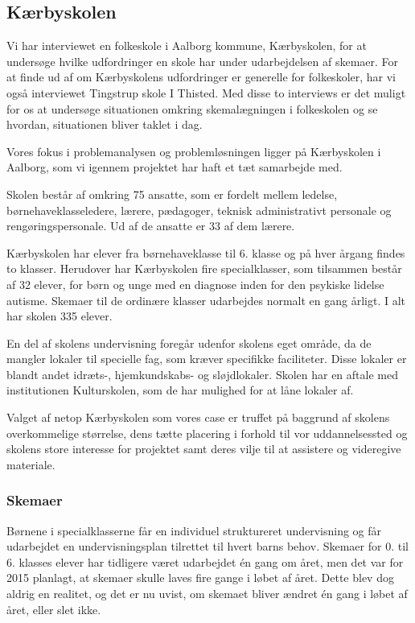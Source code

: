 \subsection{Kærbyskolen}
\label{Kaerbyskolen}
Vi har interviewet en folkeskole i Aalborg kommune, Kærbyskolen, for at undersøge hvilke udfordringer en skole har under udarbejdelsen af skemaer. For at finde ud af om Kærbyskolens udfordringer er generelle for folkeskoler, har vi også interviewet Tingstrup skole I Thisted. Med disse to interviews er det muligt for os at undersøge situationen omkring skemalægningen i folkeskolen og se hvordan, situationen bliver taklet i dag.


Vores fokus i problemanalysen og problemløsningen ligger på Kærbyskolen i Aalborg, som vi igennem projektet har haft et tæt samarbejde med.

Skolen består af omkring 75 ansatte, som er fordelt mellem ledelse, børnehaveklasseledere, lærere, pædagoger, teknisk administrativt personale og rengøringspersonale. Ud af de ansatte er 33 af dem lærere.

Kærbyskolen har elever fra børnehaveklasse til 6. klasse og på hver årgang findes to klasser. Herudover har Kærbyskolen fire specialklasser, som tilsammen består af 32 elever\cite{KaerbyskolensElevtal}, for børn og unge med en diagnose inden for den psykiske lidelse autisme. Skemaer til de ordinære klasser udarbejdes normalt en gang årligt. I alt har skolen 335 elever.

En del af skolens undervisning foregår udenfor skolens eget område, da de mangler lokaler til specielle fag, som kræver specifikke faciliteter. Disse lokaler er blandt andet idræts-, hjemkundskabs- og sløjdlokaler. Skolen har en aftale med institutionen Kulturskolen, som de har mulighed for at låne lokaler af.

Valget af netop Kærbyskolen som vores case er truffet på baggrund af skolens overkommelige størrelse, dens tætte placering i forhold til vor uddannelsessted og skolens store interesse for projektet samt deres vilje til at assistere og videregive materiale.

\subsubsection{Skemaer}
\label{Skemaer}
Børnene i specialklasserne får en individuel struktureret undervisning og får udarbejdet en undervisningsplan tilrettet til hvert barns behov\cite{j_klasser}.
Skemaer for 0. til 6. klasses elever har tidligere været udarbejdet \'en gang om året, men det var for 2015 planlagt, at skemaer skulle laves fire gange i løbet af året. Dette blev dog aldrig en realitet, og det er nu uvist, om skemaet bliver ændret \'en gang i løbet af året, eller slet ikke.

